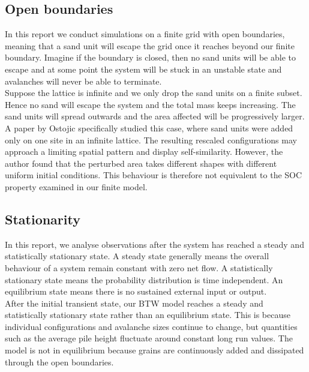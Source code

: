 \subsection{Open boundaries}\label{subsec:openboundary}

In this report we conduct simulations on a finite grid with open boundaries, meaning that a sand unit will escape the grid once it reaches beyond our finite boundary. Imagine if the boundary is closed, then no sand units will be able to escape and at some point the system will be stuck in an unstable state and avalanches will never be able to terminate.\\

Suppose the lattice is infinite and we only drop the sand units on a finite subset. Hence no sand will escape the system and the total mass keeps increasing. The sand units will spread outwards and the area affected will be progressively larger. A paper by Ostojic \cite{ostojic2003patterns} specifically studied this case, where sand units were added only on one site in an infinite lattice. The resulting rescaled configurations may approach a limiting spatial pattern and display self-similarity. However, the author found that the perturbed area takes different shapes with different uniform initial conditions. This behaviour is therefore not equivalent to the SOC property examined in our finite model.\\

\subsection{Stationarity}\label{subsec:stationary}

In this report, we analyse observations after the system has reached a steady and statistically stationary state. A steady state generally means the overall behaviour of a system remain constant with zero net flow. A statistically stationary state means the probability distribution is time independent. An equilibrium state means there is no sustained external input or output.\\

After the initial transient state, our BTW model reaches a steady and statistically stationary state rather than an equilibrium state. This is because individual configurations and avalanche sizes continue to change, but quantities such as the average pile height fluctuate around constant long run values. The model is not in equilibrium because grains are continuously added and dissipated through the open boundaries.\\


